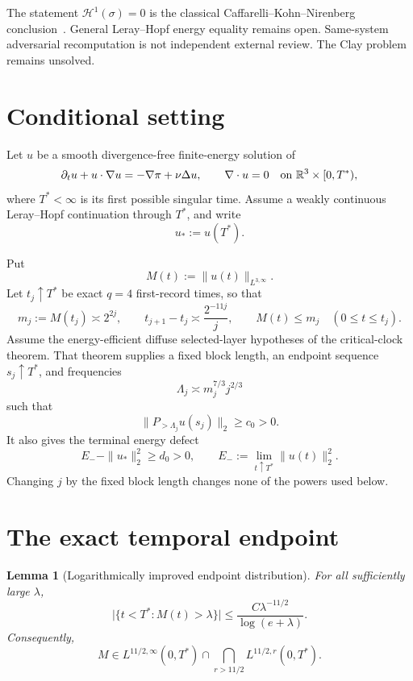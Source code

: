 \documentclass[11pt]{article}
\newtheorem{lemma}[theorem]{Lemma}
\theoremstyle{remark}
\newcommand{\R}{\mathbb R}
\newcommand{\HH}{\mathcal H}
\begin{document}
The statement \(\HH^1(\sigma)=0\) is the classical
Caffarelli--Kohn--Nirenberg conclusion~\cite{CKN82}.  General
Leray--Hopf energy equality remains open.  Same-system adversarial
recomputation is not independent external review.  The Clay problem
remains unsolved.

\section{Conditional setting}

Let \(u\) be a smooth divergence-free finite-energy solution of
\[
 \partial_tu+u\cdot\nabla u=-\nabla\pi+\nu\Delta u,
 \qquad \nabla\cdot u=0
 \quad\hbox{on }\R^3\times[0,T^*),
\]
where \(T^*<\infty\) is its first possible singular time.  Assume a
weakly continuous Leray--Hopf continuation through \(T^*\), and write
\[
 u_*:=u(T^*).
\]

Put
\[
 M(t):=\|u(t)\|_{L^{3,\infty}}.
\]
Let \(t_j\uparrow T^*\) be exact \(q=4\) first-record times, so that
\begin{equation}
 \label{eq:q4}
 m_j:=M(t_j)\asymp2^{2j},
 \qquad
 t_{j+1}-t_j\asymp\frac{2^{-11j}}j,
 \qquad
 M(t)\leq m_j\quad(0\leq t\leq t_j).
\end{equation}
Assume the energy-efficient diffuse selected-layer hypotheses of the
critical-clock theorem.  That theorem supplies a fixed block length,
an endpoint sequence \(s_j\uparrow T^*\), and frequencies
\begin{equation}
 \label{eq:Lambda}
 \Lambda_j\asymp m_j^{7/3}j^{2/3}
\end{equation}
such that
\begin{equation}
 \label{eq:old-floor}
 \|P_{>\Lambda_j}u(s_j)\|_2\geq c_0>0.
\end{equation}
It also gives the terminal energy defect
\begin{equation}
 \label{eq:energy-defect}
 E_--\|u_*\|_2^2\geq d_0>0,
 \qquad
 E_-:=\lim_{t\uparrow T^*}\|u(t)\|_2^2.
\end{equation}
Changing \(j\) by the fixed block length changes none of the powers
used below.

\section{The exact temporal endpoint}

\begin{lemma}[Logarithmically improved endpoint distribution]
\label{lem:endpoint}
For all sufficiently large \(\lambda\),
\begin{equation}
 \label{eq:distribution}
 \bigl|\{t<T^*:M(t)>\lambda\}\bigr|
 \leq
 \frac{C\lambda^{-11/2}}{\log(e+\lambda)}.
\end{equation}
Consequently,
\begin{equation}
 \label{eq:lorentz-endpoint}
 M\in L^{11/2,\infty}(0,T^*)
 \cap
 \bigcap_{r>11/2}L^{11/2,r}(0,T^*).
\end{equation}
\end{lemma}
\end{document}
